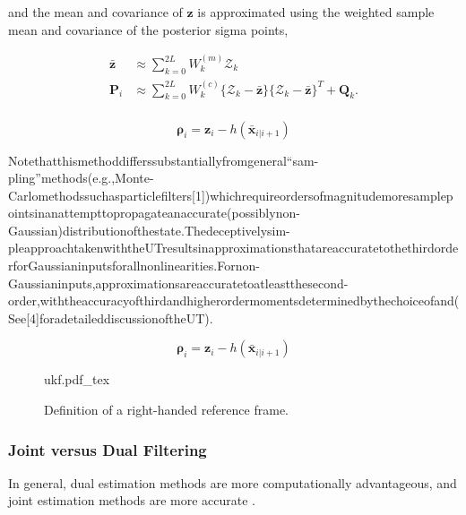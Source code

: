 and the mean and covariance of $\bm{z}$ is approximated using the weighted
sample mean and covariance of the posterior sigma points,

\begin{equation}
    \begin{alignat}{1}
        \bar{\bm{z}} & \approx \sum_{k=0}^{2L} W_k^{(m)}\mathcal{Z}_k                                                   \\
        \bm{P}_i     & \approx \sum_{k=0}^{2L} W_k^{(c)}\{\mathcal{Z}_k-\bar{\bm{z}}\}\{\mathcal{Z}_k-\bar{\bm{z}}\}^T +\bm{Q}_k. \\
    \end{alignat}
\end{equation}



\begin{equation}
   \bm{\rho}_i = \bm{z}_i - h(\bar{\bm{x}}_{i|i+1})
\end{equation}


Notethatthismethoddifferssubstantiallyfromgeneral“sam-pling”methods(e.g.,Monte-Carlomethodssuchasparticlefilters[1])whichrequireordersofmagnitudemoresamplepointsinanattempttopropagateanaccurate(possiblynon-Gaussian)distributionofthestate.Thedeceptivelysim-pleapproachtakenwiththeUTresultsinapproximationsthatareaccuratetothethirdorderforGaussianinputsforallnonlinearities.Fornon-Gaussianinputs,approximationsareaccuratetoatleastthesecond-order,withtheaccuracyofthirdandhigherordermomentsdeterminedbythechoiceofand(See[4]foradetaileddiscussionoftheUT).

\begin{equation}
   \bm{\rho}_i = \bm{z}_i - h(\bar{\bm{x}}_{i|i+1})
\end{equation}

\begin{figure}[h]
    \centering
    \def\svgwidth{0.75\linewidth}
    {ukf.pdf_tex}
    \caption{Definition of a right-handed reference frame.}
    \label{fig:frames_rh}
\end{figure}

\subsubsection{Joint versus Dual Filtering}

In general, dual estimation methods are more computationally advantageous, and
joint estimation methods are more accurate \cite{Plett2005}.



